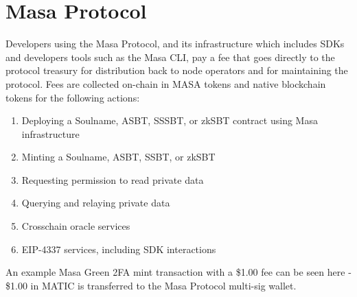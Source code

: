 \documentclass{article}
\begin{document}
\section{Masa Protocol}
Developers using the Masa Protocol, and its infrastructure which includes SDKs and developers tools such as the Masa CLI\cite{cli}, pay a fee that goes directly to the protocol treasury for distribution back to node operators and for maintaining the protocol. Fees are collected on-chain in MASA tokens and native blockchain tokens for the following actions:
\begin{enumerate}
    \item Deploying a Soulname, ASBT, SSSBT, or zkSBT contract using Masa infrastructure
    \item Minting a Soulname, ASBT, SSBT, or zkSBT
    \item Requesting permission to read private data
    \item Querying and relaying private data 
    \item Crosschain oracle services
    \item EIP-4337 services, including SDK interactions
  \end{enumerate}
An example Masa Green 2FA mint transaction with a \$1.00 fee can be seen here\cite{polygon} - \$1.00 in MATIC is transferred to the Masa Protocol multi-sig wallet\cite{polygon-multisig}.
\end{document}
